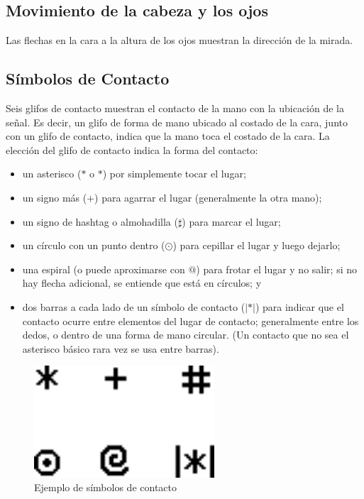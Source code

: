 \subsection{Movimiento de la cabeza y los ojos}\label{subsection:state-of-the-art:sl:head_eye_shoulders}
Las flechas en la cara a la altura de los ojos muestran la dirección de la mirada. 

\subsection{Símbolos de Contacto}\label{subsection:state-of-the-art:sl:contact_symbol}

Seis glifos de contacto muestran el contacto de la mano con la ubicación de la señal. Es decir, un glifo de forma de mano ubicado al costado de la cara, junto con un glifo de contacto, indica que la mano toca el costado de la cara. La elección del glifo de contacto indica la forma del contacto:
\begin{itemize}
	\item un asterisco ($ \ast $ o $ * $) por simplemente tocar el lugar;
    \item un signo más ($ + $) para agarrar el lugar (generalmente la otra mano);
    \item un signo de hashtag o almohadilla ($ \sharp $) para marcar el lugar;
    \item un círculo con un punto dentro ($ \odot $) para cepillar el lugar y luego dejarlo;
    \item una espiral (o puede aproximarse con $ @ $) para frotar el lugar y no salir; si no hay flecha adicional, se entiende que está en círculos; y
    \item dos barras a cada lado de un símbolo de contacto ($ |\ast| $) para indicar que el contacto ocurre entre elementos del lugar de contacto; generalmente entre los dedos, o dentro de una forma de mano circular. (Un contacto que no sea el asterisco básico rara vez se usa entre barras).
\end{itemize}

\begin{figure}[ht!]
    \centering
    \includegraphics[width=0.6\textwidth]{Graphics/contact_symbols.png}
    \caption{Ejemplo de símbolos de contacto}
    \label{fig:contact_symbols}
\end{figure}

